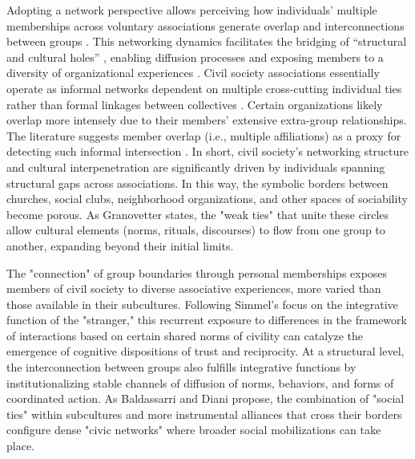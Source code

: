 Adopting a network perspective allows perceiving how individuals’ multiple memberships across voluntary associations generate overlap and interconnections between groups \parencite{white_cohesiveness_2001, kenis_how_2002, moody_structural_2003}. This networking dynamics facilitates the bridging of “structural and cultural holes” \parencite{pachucki_cultural_2010, burt_brokerage_2007}, enabling diffusion processes and exposing members to a diversity of organizational experiences \parencite{paxton_association_2007, glanville_why_2016}. Civil society associations essentially operate as informal networks dependent on multiple cross-cutting individual ties rather than formal linkages between collectives \parencite{diani_cement_2015}. Certain organizations likely overlap more intensely due to their members’ extensive extra-group relationships. The literature suggests member overlap (i.e., multiple affiliations) as a proxy for detecting such informal intersection \parencite{moody_structural_2003, paxton_association_2007, pena_lopez_capital_2018}. In short, civil society’s networking structure and cultural interpenetration are significantly driven by individuals spanning structural gaps across associations. In this way, the symbolic borders between churches, social clubs, neighborhood organizations, and other spaces of sociability become porous. As Granovetter \parencite*{granovetter_strength_1973} states, the "weak ties" that unite these circles allow cultural elements (norms, rituals, discourses) to flow from one group to another, expanding beyond their initial limits.
\bigskip

The "connection" of group boundaries through personal memberships exposes members of civil society to diverse associative experiences, more varied than those available in their subcultures. Following Simmel's \parencite*{simmel_conflict_1922} focus on the integrative function of the "stranger," this recurrent exposure to differences in the framework of interactions based on certain shared norms of civility \parencite{elias_civilizing_2010} can catalyze the emergence of cognitive dispositions of trust and reciprocity. At a structural level, the interconnection between groups also fulfills integrative functions by institutionalizing stable channels of diffusion of norms, behaviors, and forms of coordinated action. As Baldassarri and Diani \parencite{baldassarri_integrative_2007} propose, the combination of "social ties" within subcultures and more instrumental alliances that cross their borders configure dense "civic networks" where broader social mobilizations can take place.
\bigskip

